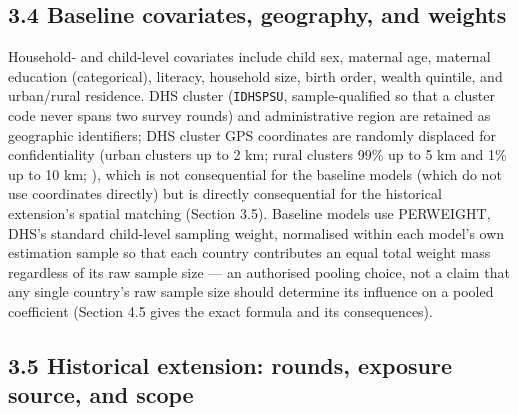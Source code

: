\subsection*{3.4 Baseline covariates, geography, and weights}

Household- and child-level covariates include child sex, maternal age, maternal education (categorical), literacy, household size, birth order, wealth quintile, and urban/rural residence. DHS cluster (\texttt{IDHSPSU}, sample-qualified so that a cluster code never spans two survey rounds) and administrative region are retained as geographic identifiers; DHS cluster GPS coordinates are randomly displaced for confidentiality (urban clusters up to 2 km; rural clusters 99\% up to 5 km and 1\% up to 10 km; \parencite{Burgert2013}), which is not consequential for the baseline models (which do not use coordinates directly) but is directly consequential for the historical extension's spatial matching (Section 3.5). Baseline models use PERWEIGHT, DHS's standard child-level sampling weight, normalised within each model's own estimation sample so that each country contributes an equal total weight mass regardless of its raw sample size --- an authorised pooling choice, not a claim that any single country's raw sample size should determine its influence on a pooled coefficient (Section 4.5 gives the exact formula and its consequences).

\subsection*{3.5 Historical extension: rounds, exposure source, and scope}

